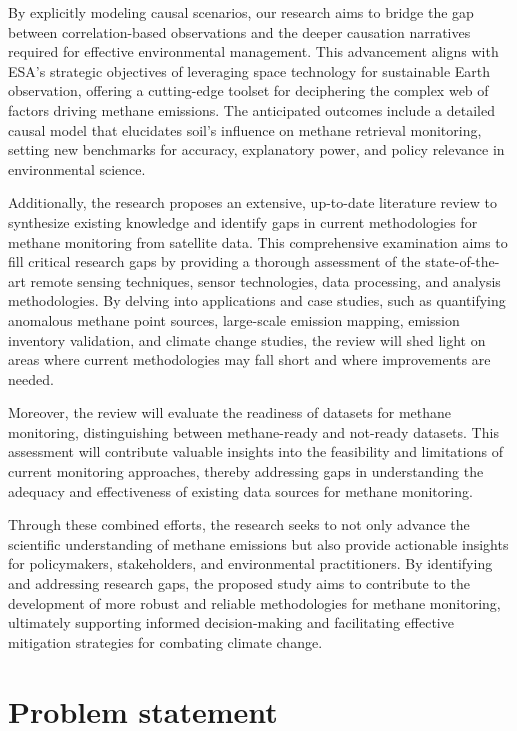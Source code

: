 By explicitly modeling causal scenarios, our research aims to bridge the gap between correlation-based observations and the deeper causation narratives required for effective environmental management. This advancement aligns with ESA's strategic objectives of leveraging space technology for sustainable Earth observation, offering a cutting-edge toolset for deciphering the complex web of factors driving methane emissions. The anticipated outcomes include a detailed causal model that elucidates soil's influence on methane retrieval monitoring, setting new benchmarks for accuracy, explanatory power, and policy relevance in environmental science.

Additionally, the research proposes an extensive, up-to-date literature review to synthesize existing knowledge and identify gaps in current methodologies for methane monitoring from satellite data. This comprehensive examination aims to fill critical research gaps by providing a thorough assessment of the state-of-the-art remote sensing techniques, sensor technologies, data processing, and analysis methodologies. By delving into applications and case studies, such as quantifying anomalous methane point sources, large-scale emission mapping, emission inventory validation, and climate change studies, the review will shed light on areas where current methodologies may fall short and where improvements are needed.

Moreover, the review will evaluate the readiness of datasets for methane monitoring, distinguishing between methane-ready and not-ready datasets. This assessment will contribute valuable insights into the feasibility and limitations of current monitoring approaches, thereby addressing gaps in understanding the adequacy and effectiveness of existing data sources for methane monitoring.


Through these combined efforts, the research seeks to not only advance the scientific understanding of methane emissions but also provide actionable insights for policymakers, stakeholders, and environmental practitioners. By identifying and addressing research gaps, the proposed study aims to contribute to the development of more robust and reliable methodologies for methane monitoring, ultimately supporting informed decision-making and facilitating effective mitigation strategies for combating climate change.


\section{Problem statement}

